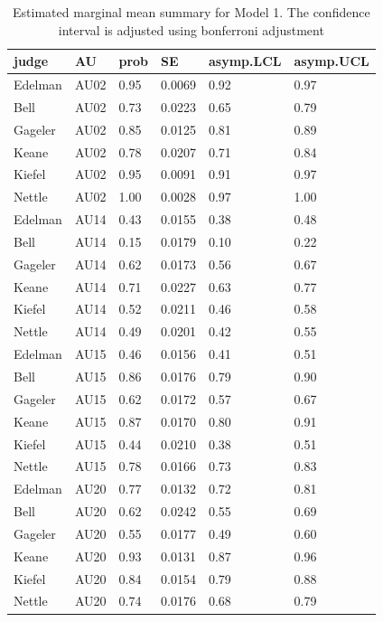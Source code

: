 \documentclass{monashthesis}
\begin{document}
\begin{table}[ht]
\begin{center}
\caption{\label{tab:result_1}Estimated marginal mean summary for Model 1. The confidence interval is adjusted using bonferroni adjustment}
\begin{tabular}{llllll}
\toprule
judge & AU & prob & SE & asymp.LCL & asymp.UCL \\
\midrule
Edelman & AU02 & 0.95 & 0.0069 & 0.92 & 0.97 \\
Bell & AU02 & 0.73 & 0.0223 & 0.65 & 0.79 \\
Gageler & AU02 & 0.85 & 0.0125 & 0.81 & 0.89 \\
Keane & AU02 & 0.78 & 0.0207 & 0.71 & 0.84 \\
Kiefel & AU02 & 0.95 & 0.0091 & 0.91 & 0.97 \\
Nettle & AU02 & 1.00 & 0.0028 & 0.97 & 1.00 \\
Edelman & AU14 & 0.43 & 0.0155 & 0.38 & 0.48 \\
Bell & AU14 & 0.15 & 0.0179 & 0.10 & 0.22 \\
Gageler & AU14 & 0.62 & 0.0173 & 0.56 & 0.67 \\
Keane & AU14 & 0.71 & 0.0227 & 0.63 & 0.77 \\
Kiefel & AU14 & 0.52 & 0.0211 & 0.46 & 0.58 \\
Nettle & AU14 & 0.49 & 0.0201 & 0.42 & 0.55 \\
Edelman & AU15 & 0.46 & 0.0156 & 0.41 & 0.51 \\
Bell & AU15 & 0.86 & 0.0176 & 0.79 & 0.90 \\
Gageler & AU15 & 0.62 & 0.0172 & 0.57 & 0.67 \\
Keane & AU15 & 0.87 & 0.0170 & 0.80 & 0.91 \\
Kiefel & AU15 & 0.44 & 0.0210 & 0.38 & 0.51 \\
Nettle & AU15 & 0.78 & 0.0166 & 0.73 & 0.83 \\
Edelman & AU20 & 0.77 & 0.0132 & 0.72 & 0.81 \\
Bell & AU20 & 0.62 & 0.0242 & 0.55 & 0.69 \\
Gageler & AU20 & 0.55 & 0.0177 & 0.49 & 0.60 \\
Keane & AU20 & 0.93 & 0.0131 & 0.87 & 0.96 \\
Kiefel & AU20 & 0.84 & 0.0154 & 0.79 & 0.88 \\
Nettle & AU20 & 0.74 & 0.0176 & 0.68 & 0.79 \\
\bottomrule
\end{tabular}
\end{center}
\end{table}
\end{document}
